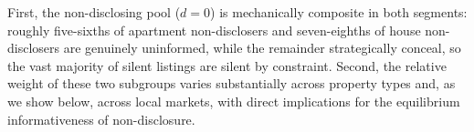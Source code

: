 \noindent First, the non-disclosing pool ($d=0$) is mechanically composite in both segments: roughly five-sixths of apartment non-disclosers and seven-eighths of house non-disclosers are genuinely uninformed, while the remainder strategically conceal, so the vast majority of silent listings are silent by constraint. Second, the relative weight of these two subgroups varies substantially across property types and, as we show below, across local markets, with direct implications for the equilibrium informativeness of non-disclosure.
